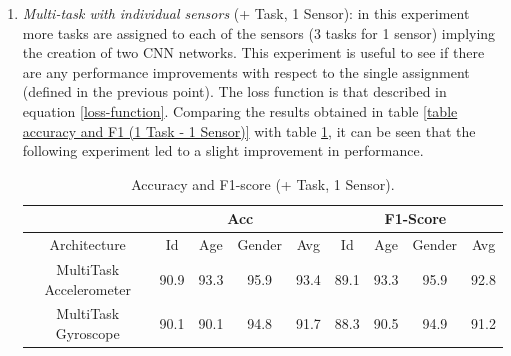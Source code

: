 \begin{enumerate}
    \item \emph{Multi-task with individual sensors} (+ Task, 1 Sensor): in this experiment 
    more tasks are assigned to each of the sensors (3 tasks for 1 
    sensor) implying the creation of two CNN networks. This experiment 
    is useful to see if there are any performance improvements with respect 
    to the single assignment (defined in the previous point). The loss function 
    is that described in equation \ref{loss-function}. Comparing the results obtained 
    in table \ref{table accuracy and F1 (1 Task - 1 Sensor)} with table \ref{table accuracy and F1 (more Task - 1 Sensor)}, it can be seen that the following experiment led 
    to a slight improvement in performance.
    \begin{table}[h!]
        \centering
        \begin{adjustbox}{max width=\textwidth}
        \begin{tabular}{|c||ccc|c||ccc|c|}
            \hline
                & \multicolumn{4}{c||}{Acc} & \multicolumn{4}{c|}{F1-Score} \\
            \hline
                Architecture & Id & Age & Gender & Avg & Id & Age & Gender & Avg\\
            \hline
                MultiTask Accelerometer & 90.9 & 93.3 & 95.9 & 93.4 & 89.1 & 93.3 & 95.9 & 92.8\\
                MultiTask Gyroscope & 90.1 & 90.1 & 94.8 & 91.7 & 88.3 & 90.5 & 94.9 & 91.2\\
            \hline 
        \end{tabular}
        \end{adjustbox}
        \caption{Accuracy and F1-score (+ Task, 1 Sensor).}
        \label{table accuracy and F1 (more Task - 1 Sensor)}
    \end{table}


\end{enumerate}
